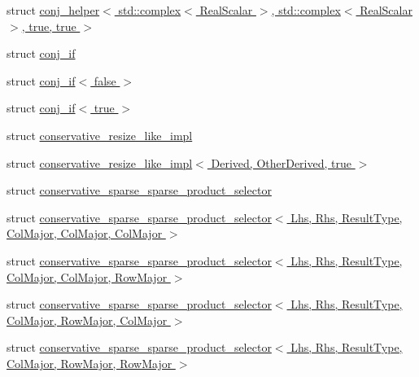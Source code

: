 \begin{DoxyCompactItemize}
\item 
struct \hyperlink{struct_eigen_1_1internal_1_1conj__helper_3_01std_1_1complex_3_01_real_scalar_01_4_00_01std_1_1co7e279017f32d052cf58f01f1590ee000}{conj\+\_\+helper$<$ std\+::complex$<$ Real\+Scalar $>$, std\+::complex$<$ Real\+Scalar $>$, true, true $>$}
\item 
struct \hyperlink{struct_eigen_1_1internal_1_1conj__if}{conj\+\_\+if}
\item 
struct \hyperlink{struct_eigen_1_1internal_1_1conj__if_3_01false_01_4}{conj\+\_\+if$<$ false $>$}
\item 
struct \hyperlink{struct_eigen_1_1internal_1_1conj__if_3_01true_01_4}{conj\+\_\+if$<$ true $>$}
\item 
struct \hyperlink{struct_eigen_1_1internal_1_1conservative__resize__like__impl}{conservative\+\_\+resize\+\_\+like\+\_\+impl}
\item 
struct \hyperlink{struct_eigen_1_1internal_1_1conservative__resize__like__impl_3_01_derived_00_01_other_derived_00_01true_01_4}{conservative\+\_\+resize\+\_\+like\+\_\+impl$<$ Derived, Other\+Derived, true $>$}
\item 
struct \hyperlink{struct_eigen_1_1internal_1_1conservative__sparse__sparse__product__selector}{conservative\+\_\+sparse\+\_\+sparse\+\_\+product\+\_\+selector}
\item 
struct \hyperlink{struct_eigen_1_1internal_1_1conservative__sparse__sparse__product__selector_3_01_lhs_00_01_rhs_0f4a0316e9e8c40b475b674926b5b8b8d}{conservative\+\_\+sparse\+\_\+sparse\+\_\+product\+\_\+selector$<$ Lhs, Rhs, Result\+Type, Col\+Major, Col\+Major, Col\+Major $>$}
\item 
struct \hyperlink{struct_eigen_1_1internal_1_1conservative__sparse__sparse__product__selector_3_01_lhs_00_01_rhs_0f1680f6d2d45917adac59b754c8465e6}{conservative\+\_\+sparse\+\_\+sparse\+\_\+product\+\_\+selector$<$ Lhs, Rhs, Result\+Type, Col\+Major, Col\+Major, Row\+Major $>$}
\item 
struct \hyperlink{struct_eigen_1_1internal_1_1conservative__sparse__sparse__product__selector_3_01_lhs_00_01_rhs_0d6546946ae9a7e5a4739479fa99718a1}{conservative\+\_\+sparse\+\_\+sparse\+\_\+product\+\_\+selector$<$ Lhs, Rhs, Result\+Type, Col\+Major, Row\+Major, Col\+Major $>$}
\item 
struct \hyperlink{struct_eigen_1_1internal_1_1conservative__sparse__sparse__product__selector_3_01_lhs_00_01_rhs_0f2b5b8a9c2dc31e0d24e7f7768286a83}{conservative\+\_\+sparse\+\_\+sparse\+\_\+product\+\_\+selector$<$ Lhs, Rhs, Result\+Type, Col\+Major, Row\+Major, Row\+Major $>$}

\end{DoxyCompactItemize}
